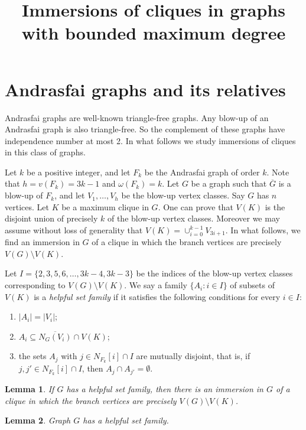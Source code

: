 \documentclass[a4paper,12pt]{article}
\title{Immersions of cliques in graphs \\ with bounded maximum degree}
\newtheorem{lemma}{Lemma}[section]
\begin{document}
\maketitle

\section{Andrasfai graphs and its relatives}

Andrasfai graphs are well-known triangle-free graphs. 
Any blow-up of an Andrasfai graph is also triangle-free.
So the complement of these graphs have independence number at most 2. 
In what follows we study immersions of cliques in this class of graphs. 
 
Let \(k\) be a positive integer, and let \(F_k\) be the Andrasfai graph of order $k$.
Note that \(h = v(F_k) = 3k-1\) and \(\omega(F_k) = k\).
Let \(G\) be a graph such that \(\overline{G}\) is a blow-up of \(F_k\), 
and let \(V_1,\ldots, V_h\) be the blow-up vertex classes.
Say \(G\) has \(n\) vertices.
Let \(K\) be a maximum clique in \(G\).
One can prove that \(V(K)\) is the disjoint union of precisely \(k\) of the blow-up vertex classes.
Moreover we may assume without loss of generality that \(V(K) = \cup_{i=0}^{k-1} V_{3i+1}\).
In what follows, we find an immersion in \(G\) of a clique in which the branch vertices are 
precisely \(V(G)\setminus V(K)\).

Let \(I = \{2,3,5,6,\ldots,3k-4,3k-3\}\) be the indices of the blow-up vertex classes
corresponding to \(V(G)\setminus V(K)\).
We say a family \(\{A_i: i \in I\}\) of subsets of \(V(K)\) is a \emph{helpful set family} 
if it satisfies the following conditions for every \(i \in I\):
\begin{enumerate}
\item \(|A_i| = |V_i|\);
\item \(A_i \subseteq \overline{N_G(V_i)} \cap V(K)\);
\item the sets \(A_j\) with \(j \in N_{F_k}[i]\cap I\) are mutually disjoint, 
  that is, if \(j,j' \in N_{F_k}[i] \cap I\), then \(A_j\cap A_{j'} = \emptyset\).
\end{enumerate}

\begin{lemma}
  If \(G\) has a helpful set family, then there is an immersion in \(G\) of 
  a clique in which the branch vertices are precisely \(V(G)\setminus V(K)\).
\end{lemma}

\begin{lemma}
  Graph \(G\) has a helpful set family. 
\end{lemma}
\end{document}
